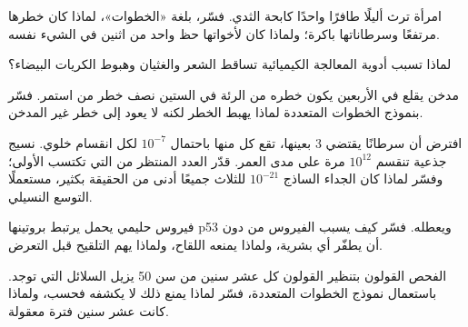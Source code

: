\begin{exercise}[$\star\star$]\label{exo:g11:cancer:9}
امرأة ترث أليلًا طافرًا واحدًا  كابحة  الثدي. فسّر،
بلغة «الخطوات»، لماذا كان خطرها مرتفعًا وسرطاناتها باكرة؛ ولماذا كان
لأخواتها حظ واحد من اثنين في الشيء نفسه.
\end{exercise}

\begin{exercise}[$\star\star$]\label{exo:g11:cancer:10}
لماذا تسبب أدوية المعالجة الكيميائية تساقط الشعر والغثيان وهبوط
الكريات البيضاء؟
\end{exercise}

\begin{exercise}[$\star\star$]\label{exo:g11:cancer:11}
مدخن يقلع في الأربعين يكون خطره من  الرئة في الستين نصف خطر من
استمر. فسّر بنموذج الخطوات المتعددة لماذا يهبط الخطر لكنه لا يعود إلى
خطر غير المدخن.
\end{exercise}

\begin{exercise}[$\star\star\star$]\label{exo:g11:cancer:12}
افترض أن سرطانًا يقتضي 3  بعينها، تقع كل منها باحتمال $10^{-7}$
لكل انقسام خلوي.  نسيج جذعية تنقسم $10^{12}$ مرة على مدى العمر.
قدّر العدد المنتظر من  التي تكتسب  الأولى؛ وفسّر لماذا
كان الجداء الساذج $10^{-21}$ للثلاث جميعًا أدنى من الحقيقة بكثير،
مستعملًا التوسع النسيلي.
\end{exercise}

\begin{exercise}[$\star\star\star$]\label{exo:g11:cancer:13}
فيروس حليمي يحمل  يرتبط بروتينها  p53 ويعطله. فسّر كيف يسبب
الفيروس  من دون أن يطفّر أي  بشرية، ولماذا يمنعه اللقاح،
ولماذا يهم التلقيح قبل التعرض.
\end{exercise}

\begin{exercise}[$\star\star\star$]\label{exo:g11:cancer:14}
الفحص  القولون بتنظير القولون كل عشر سنين من سن 50 يزيل السلائل
التي توجد. باستعمال نموذج الخطوات المتعددة، فسّر لماذا يمنع ذلك
 لا يكشفه فحسب، ولماذا كانت عشر سنين فترة معقولة.
\end{exercise}

